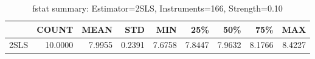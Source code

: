 \begin{table}[ht]
\centering
\caption{fstat summary: Estimator=2SLS, Instruments=166, Strength=0.10}
\begin{tabular}{lrrrrrrrr}
\toprule
 & COUNT & MEAN & STD & MIN & 25\% & 50\% & 75\% & MAX \\
\midrule
2SLS & 10.0000 & 7.9955 & 0.2391 & 7.6758 & 7.8447 & 7.9632 & 8.1766 & 8.4227 \\
\bottomrule
\end{tabular}
\end{table}
